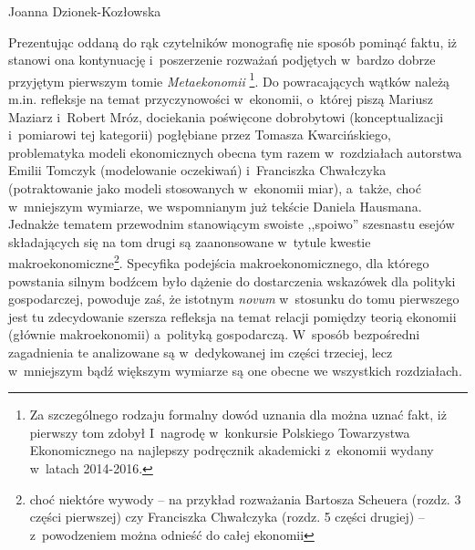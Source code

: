 \begin{recplenv}{Joanna Dzionek-Kozłowska}
\enlargethispage{-.5\baselineskip}

Prezentując oddaną do rąk czytelników monografię nie sposób pominąć faktu, iż stanowi ona kontynuację i~poszerzenie
rozważań podjętych w~bardzo dobrze przyjętym pierwszym tomie \textit{Metaekonomii}
\parencite{gorazda_metaekonomia:_2016}\footnote{Za szczególnego rodzaju formalny dowód uznania dla  można uznać fakt, iż pierwszy tom zdobył
	I~nagrodę w~konkursie Polskiego Towarzystwa Ekonomicznego
	na najlepszy podręcznik akademicki z~ekonomii wydany w~latach 2014-2016.}.
Do powracających wątków należą m.in. refleksje na temat przyczynowości w~ekonomii, o~której piszą Mariusz
Maziarz i~Robert Mróz, dociekania poświęcone dobrobytowi (konceptualizacji i~pomiarowi tej kategorii)
pogłębiane przez Tomasza
Kwarcińskiego, problematyka modeli ekonomicznych obecna tym razem w~rozdziałach autorstwa Emilii Tomczyk (modelowanie
oczekiwań) i~Franciszka Chwałczyka (potraktowanie jako modeli stosowanych w~ekonomii miar), a~także, choć w~mniejszym
wymiarze, we wspomnianym już tekście Daniela Hausmana. Jednakże tematem przewodnim stanowiącym swoiste ,,spoiwo''
szesnastu esejów składających się na tom drugi są zaanonsowane w~tytule kwestie makroekonomiczne\footnote{choć niektóre
	wywody -- na przykład rozważania Bartosza Scheuera (rozdz. 3 części pierwszej) czy Franciszka Chwałczyka (rozdz. 5 części
drugiej) -- z~powodzeniem można odnieść do całej ekonomii}. Specyfika podejścia makroekonomicznego, dla którego
powstania silnym bodźcem było dążenie do dostarczenia wskazówek dla polityki gospodarczej, powoduje zaś, że istotnym
\textit{novum} w~stosunku do tomu pierwszego jest tu zdecydowanie szersza refleksja na temat relacji pomiędzy teorią
ekonomii (głównie makroekonomii) a~polityką gospodarczą. W~sposób bezpośredni zagadnienia te analizowane
są w~dedykowanej im części trzeciej, lecz w~mniejszym bądź większym wymiarze są one obecne we wszystkich rozdziałach. 


\end{recplenv}
